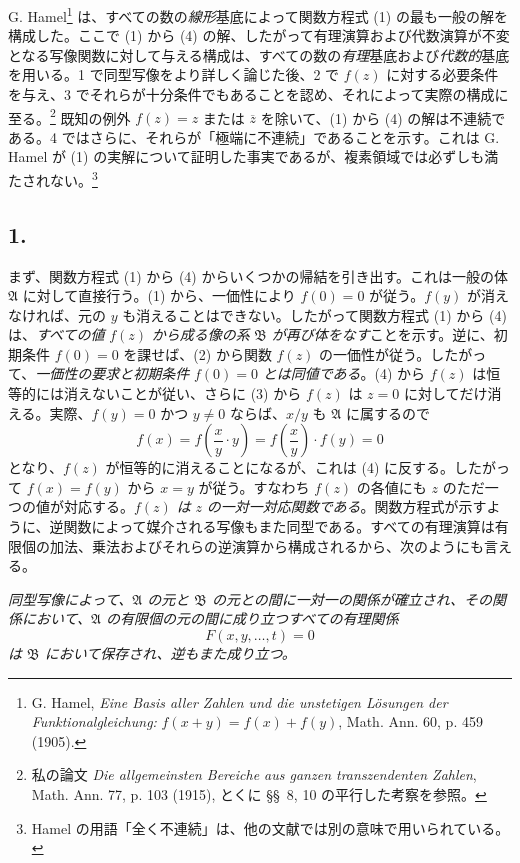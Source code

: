\documentclass[11pt]{article}
\begin{document}
G. Hamel\footnote{G. Hamel, \emph{Eine Basis aller Zahlen und die unstetigen Lösungen der Funktionalgleichung:} $f(x+y)=f(x)+f(y)$, Math. Ann. 60, p. 459 (1905).} は、すべての数の\emph{線形}基底によって関数方程式 (1) の最も一般の解を構成した。ここで (1) から (4) の解、したがって有理演算および代数演算が不変となる写像関数に対して与える構成は、すべての数の\emph{有理}基底および\emph{代数的}基底を用いる。1 で同型写像をより詳しく論じた後、2 で $f(z)$ に対する必要条件を与え、3 でそれらが十分条件でもあることを認め、それによって実際の構成に至る。\footnote{私の論文 \emph{Die allgemeinsten Bereiche aus ganzen transzendenten Zahlen}, Math. Ann. 77, p. 103 (1915), とくに \S\S\ 8, 10 の平行した考察を参照。} 既知の例外 $f(z)=z$ または $\overline z$ を除いて、(1) から (4) の解は不連続である。4 ではさらに、それらが「極端に不連続」であることを示す。これは G. Hamel が (1) の実解について証明した事実であるが、複素領域では必ずしも満たされない。\footnote{Hamel の用語「全く不連続」は、他の文献では別の意味で用いられている。}

\subsection*{1.}

まず、関数方程式 (1) から (4) からいくつかの帰結を引き出す。これは一般の体 $\mathfrak A$ に対して直接行う。(1) から、一価性により $f(0)=0$ が従う。$f(y)$ が消えなければ、元の $y$ も消えることはできない。したがって関数方程式 (1) から (4) は、\emph{すべての値} $f(z)$ \emph{から成る像の系} $\mathfrak B$ \emph{が再び体をなす}ことを示す。逆に、初期条件 $f(0)=0$ を課せば、(2) から関数 $f(z)$ の一価性が従う。したがって、\emph{一価性の要求と初期条件} $f(0)=0$ \emph{とは同値である}。(4) から $f(z)$ は恒等的には消えないことが従い、さらに (3) から $f(z)$ は $z=0$ に対してだけ消える。実際、$f(y)=0$ かつ $y\ne0$ ならば、$x/y$ も $\mathfrak A$ に属するので
\[
f(x)=f\!\left(\frac{x}{y}\cdot y\right)=f\!\left(\frac{x}{y}\right)\cdot f(y)=0
\]
となり、$f(z)$ が恒等的に消えることになるが、これは (4) に反する。したがって $f(x)=f(y)$ から $x=y$ が従う。すなわち $f(z)$ の各値にも $z$ のただ一つの値が対応する。\emph{$f(z)$ は} $z$ \emph{の一対一対応関数である}。関数方程式が示すように、逆関数によって媒介される写像もまた同型である。すべての有理演算は有限個の加法、乗法およびそれらの逆演算から構成されるから、次のようにも言える。

\emph{同型写像によって、$\mathfrak A$ の元と $\mathfrak B$ の元との間に一対一の関係が確立され、その関係において、$\mathfrak A$ の有限個の元の間に成り立つすべての有理関係
\[
F(x,y,\ldots,t)=0
\]
は $\mathfrak B$ において保存され、逆もまた成り立つ。}
\end{document}
